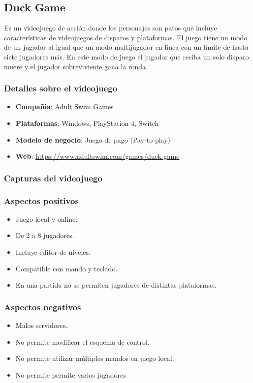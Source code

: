 \documentclass[12pt, spanish]{article}
\begin{document}
\subsection{Duck Game}

Es un videojuego de acción donde los personajes son patos que incluye características de videojuegos de disparos y plataformas. El juego tiene un modo de un jugador al igual que un modo multijugador en línea con un límite de hasta siete jugadores más. En este modo de juego el jugador que reciba un solo disparo muere y el jugador sobreviviente gana la ronda.


\subsubsection{Detalles sobre el videojuego}

\begin{itemize}
	\item \textbf{Compañia}: Adult Swim Games
	\item \textbf{Plataformas}: Windows, PlayStation 4, Switch
	\item \textbf{Modelo de negocio}: Juego de pago (Pay-to-play)
	\item \textbf{Web}: \url{https://www.adultswim.com/games/duck-game}
\end{itemize}

\subsubsection{Capturas del videojuego}

\subsubsection{Aspectos positivos}

\begin{itemize}
	\item Juego local y online.
	\item De 2 a 8 jugadores.
	\item Incluye editor de niveles.
	\item Compatible con mando y teclado.
	\item En una partida no se permiten jugadores de distintas plataformas.
\end{itemize}

\subsubsection{Aspectos negativos}

\begin{itemize}
	\item Malos servidores.
	\item No permite modificar el esquema de control.
	\item No permite utilizar múltiples mandos en juego local.
	\item No permite permite varios jugadores
\end{itemize}
\end{document}
